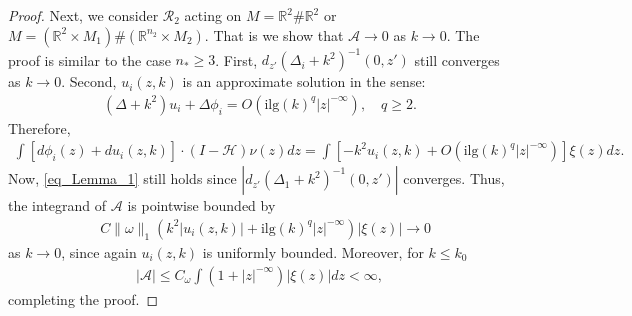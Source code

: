 \documentclass[12pt]{amsart}
\begin{document}
\begin{proof}
Next, we consider $\mathcal{R}_2$ acting on $M=\mathbb{R}^2 \# \mathbb{R}^2$ or $M=(\mathbb{R}^2 \times M_1) \# (\mathbb{R}^{n_2}\times M_2)$. That is we show that $\mathcal{A}\to 0$ as $k\to 0$. The proof is similar to the case $n_*\ge 3$. First, $d_{z'}(\Delta_i+k^2)^{-1}(0,z')$ still converges as $k\to 0$. Second, $u_i(z,k)$ is an approximate solution in the sense:
\begin{align*}
    (\Delta+k^2)u_i + \Delta \phi_i = O\left(\textrm{ilg}(k)^q |z|^{-\infty}\right), \quad q\ge 2.
\end{align*}
Therefore, 
\begin{align*}
    \int \left[ d\phi_i(z) + du_i(z,k) \right] \cdot (I-\mathcal{H})\nu(z) dz = \int \left[ -k^2 u_i(z,k) + O\left(\textrm{ilg}(k)^q |z|^{-\infty}\right) \right]  \xi(z) dz.
\end{align*}
Now, \eqref{eq_Lemma_1} still holds since $|d_{z'}(\Delta_1+k^2)^{-1}(0,z')|$ converges. Thus, the integrand of $\mathcal{A}$ is pointwise bounded by
\begin{align*}
    &C \|\omega\|_1 \left(k^2|u_i(z,k)| + \textrm{ilg}(k)^q |z|^{-\infty} \right) |\xi(z)| \to 0
\end{align*}
as $k \to 0$, since again $u_i(z,k)$ is uniformly bounded. Moreover, for $k\le k_0$
\begin{align*}
    |\mathcal{A}| \le C_\omega \int (1+|z|^{-\infty}) |\xi(z)| dz < \infty,
\end{align*}
completing the proof.

\end{proof}
\end{document}
